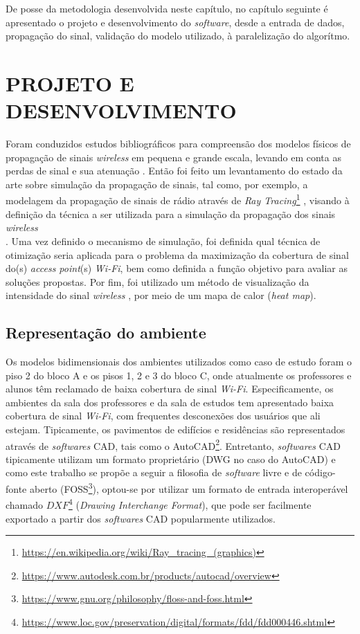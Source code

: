 \documentclass[
	12pt,				%
	twoside,			%
	a4paper,			%
	english,			%
	french,				%
	spanish,			%
	brazil				%
	]{abntex2}
\begin{document}
De posse da metodologia desenvolvida neste capítulo, no capítulo
seguinte é apresentado o projeto e desenvolvimento do \emph{software},
desde a entrada de dados, propagação do sinal, validação do modelo
utilizado, à paralelização do algorítmo.

\chapter{PROJETO E DESENVOLVIMENTO}\label{sec:projeto}

Foram conduzidos estudos bibliográficos para compreensão dos modelos
físicos de propagação de sinais \emph{wireless} em pequena e grande
escala, levando em conta as perdas de sinal e sua atenuação
\cite{ALMERS}. Então foi feito um levantamento do estado da arte sobre
simulação da propagação de sinais, tal como, por exemplo, a modelagem da
propagação de sinais de rádio através de \emph{Ray Tracing}\footnote{\url{https://en.wikipedia.org/wiki/Ray_tracing_(graphics)}}
\cite{YUN}, visando à definição da técnica a ser utilizada para a
simulação da propagação dos sinais \emph{wireless}\\
\cite{LENTZ, NAJNUDEL, SANDEEP}. Uma vez definido o mecanismo de
simulação, foi definida qual técnica de otimização seria aplicada para o
problema da maximização da cobertura de sinal do(s) \emph{access
point}(s) \emph{Wi-Fi}, bem como definida a função objetivo para avaliar
as soluções propostas. Por fim, foi utilizado um método de visualização
da intensidade do sinal \emph{wireless} \cite{RENSBURG,SULAIMAN} , por
meio de um mapa de calor (\emph{heat map}).

\section{Representação do
ambiente}\label{representauxe7uxe3o-do-ambiente}

Os modelos bidimensionais dos ambientes utilizados como caso de estudo
foram o piso 2 do bloco A e os pisos 1, 2 e 3 do bloco C, onde
atualmente os professores e alunos têm reclamado de baixa cobertura de
sinal \emph{Wi-Fi}. Especificamente, os ambientes da sala dos
professores e da sala de estudos tem apresentado baixa cobertura de
sinal \emph{Wi-Fi}, com frequentes desconexões dos usuários que ali
estejam. Tipicamente, os pavimentos de edifícios e residências são
representados através de \emph{softwares} CAD, tais como o
AutoCAD\footnote{\url{https://www.autodesk.com.br/products/autocad/overview}}.
Entretanto, \emph{softwares} CAD tipicamente utilizam um formato
proprietário (DWG no caso do AutoCAD) e como este trabalho se propõe a
seguir a filosofia de \emph{software} livre e de código-fonte aberto
(FOSS\footnote{\url{https://www.gnu.org/philosophy/floss-and-foss.html}}),
optou-se por utilizar um formato de entrada interoperável chamado
\(DXF\)\footnote{\url{https://www.loc.gov/preservation/digital/formats/fdd/fdd000446.shtml}}
(\emph{Drawing Interchange Format}), que pode ser facilmente exportado a
partir dos \emph{softwares} CAD popularmente utilizados.
\end{document}
